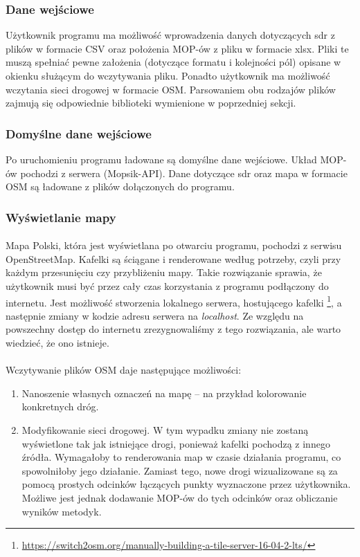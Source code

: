 \subsubsection{Dane wejściowe}
Użytkownik programu ma możliwość wprowadzenia danych dotyczących \acrshort{sdr}
z plików w formacie CSV oraz położenia MOP-ów z pliku w formacie xlsx. Pliki te muszą spełniać pewne
założenia (dotyczące formatu i kolejności pól) opisane w okienku służącym do
wczytywania pliku. Ponadto użytkownik ma możliwość wczytania sieci drogowej w
formacie OSM. Parsowaniem obu rodzajów plików zajmują się odpowiednie
biblioteki wymienione w poprzedniej sekcji.
\subsubsection{Domyślne dane wejściowe}
Po uruchomieniu programu ładowane są domyślne dane wejściowe. Układ MOP-ów
pochodzi z serwera (Mopsik-API). Dane dotyczące \acrshort{sdr} oraz mapa w formacie OSM są
ładowane z plików dołączonych do programu. 
\subsubsection{Wyświetlanie mapy}
\paragraph{} 
Mapa Polski, która jest wyświetlana po otwarciu programu, pochodzi z
serwisu \mbox{OpenStreetMap}. Kafelki są ściągane i renderowane według potrzeby, czyli
przy każdym przesunięciu czy przybliżeniu mapy. Takie rozwiązanie sprawia, że
użytkownik musi być przez cały czas korzystania z programu podłączony
do internetu. Jest możliwość stworzenia lokalnego serwera, hostującego
kafelki
\footnote{\url{https://switch2osm.org/manually-building-a-tile-server-16-04-2-lts/}}, a
następnie zmiany w kodzie adresu serwera na \textit{localhost}. Ze względu na
powszechny dostęp do internetu zrezygnowaliśmy z tego rozwiązania, ale warto
wiedzieć, że ono istnieje. 
\paragraph{}
Wczytywanie plików OSM daje następujące możliwości:
\begin{enumerate}
  \item Nanoszenie własnych oznaczeń na mapę -- na przykład kolorowanie
    konkretnych dróg.
  \item Modyfikowanie sieci drogowej. W tym wypadku zmiany nie zostaną
    wyświetlone tak jak istniejące drogi, ponieważ kafelki pochodzą z innego
    źródła. Wymagałoby to renderowania map w czasie działania programu, co
    spowolniłoby jego działanie. Zamiast tego, nowe drogi wizualizowane są
    za pomocą prostych odcinków łączących punkty wyznaczone przez użytkownika. 
    Możliwe jest jednak dodawanie MOP-ów do tych odcinków oraz obliczanie
    wyników metodyk.
\end{enumerate}
